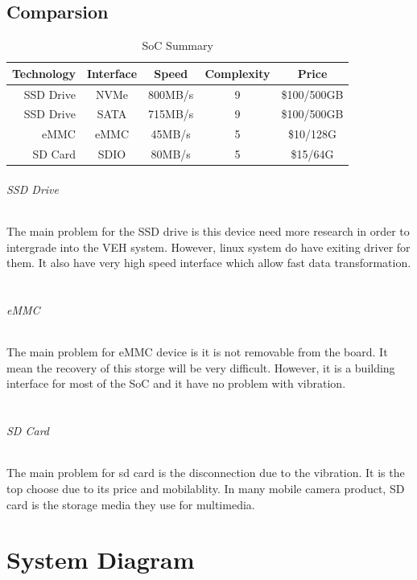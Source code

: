 \documentclass[12pt,article]{memoir}
\begin{document}
\section{Comparsion}
\begin{table}[H]
	\centering
		\begin{tabu}{r || c | c | c | c }
		Technology & Interface & Speed & Complexity & Price\\ \hline
		SSD Drive & NVMe & 800MB/s & 9 &  \$100/500GB\\
		SSD Drive & SATA & 715MB/s & 9 & \$100/500GB \\
		eMMC & eMMC & 45MB/s & 5 & \$10/128G \\
		SD Card & SDIO & 80MB/s & 5 & \$15/64G \\
		\end{tabu}
	\caption{SoC Summary}
	\label{tab:socs}
\end{table}
\subparagraph{SSD Drive}
The main problem for the SSD drive is this device need more research in order to intergrade into the VEH system. However, linux system do have exiting driver for them. It also have very high speed interface which allow fast data transformation.\\\\
\subparagraph{eMMC}
The main problem for eMMC device is it is not removable from the board. It mean the recovery of this storge will be very difficult. However, it is a building interface for most of the SoC and it have no problem with vibration.\\\\
\subparagraph{SD Card}
The main problem for sd card is the disconnection due to the vibration. It is the top choose due to its price and mobilablity. In many mobile camera product, SD card is the storage media they use for multimedia.
\newpage
\chapter{System Diagram}
\end{document}
